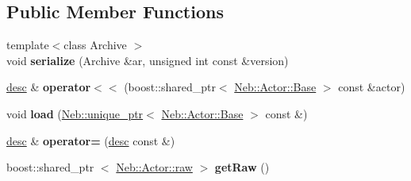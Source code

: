 \subsection*{\-Public \-Member \-Functions}
\begin{DoxyCompactItemize}
\item 
\hypertarget{classNeb_1_1Actor_1_1desc_aa46b5e2700b61f5bea052b88745cb247}{{\footnotesize template$<$class Archive $>$ }\\void {\bfseries serialize} (\-Archive \&ar, unsigned int const \&version)}\label{classNeb_1_1Actor_1_1desc_aa46b5e2700b61f5bea052b88745cb247}

\item 
\hypertarget{classNeb_1_1Actor_1_1desc_aea36e3efdf98f30101cb6aca223d51b5}{\hyperlink{classNeb_1_1Actor_1_1desc}{desc} \& {\bfseries operator$<$$<$} (boost\-::shared\-\_\-ptr$<$ \hyperlink{classNeb_1_1Actor_1_1Base}{\-Neb\-::\-Actor\-::\-Base} $>$ const \&actor)}\label{classNeb_1_1Actor_1_1desc_aea36e3efdf98f30101cb6aca223d51b5}

\item 
\hypertarget{classNeb_1_1Actor_1_1desc_af2fde9c8751c5d2d9ebe38d36a8acab5}{void {\bfseries load} (\hyperlink{classNeb_1_1unique__ptr}{\-Neb\-::unique\-\_\-ptr}$<$ \hyperlink{classNeb_1_1Actor_1_1Base}{\-Neb\-::\-Actor\-::\-Base} $>$ const \&)}\label{classNeb_1_1Actor_1_1desc_af2fde9c8751c5d2d9ebe38d36a8acab5}

\item 
\hypertarget{classNeb_1_1Actor_1_1desc_aec64f60a2aa08873c91b60189bec69e4}{\hyperlink{classNeb_1_1Actor_1_1desc}{desc} \& {\bfseries operator=} (\hyperlink{classNeb_1_1Actor_1_1desc}{desc} const \&)}\label{classNeb_1_1Actor_1_1desc_aec64f60a2aa08873c91b60189bec69e4}

\item 
\hypertarget{classNeb_1_1Actor_1_1desc_a5d652110b4f6bc979ccfdd0d346c40b7}{boost\-::shared\-\_\-ptr\*
$<$ \hyperlink{classNeb_1_1Actor_1_1raw}{\-Neb\-::\-Actor\-::raw} $>$ {\bfseries get\-Raw} ()}\label{classNeb_1_1Actor_1_1desc_a5d652110b4f6bc979ccfdd0d346c40b7}

\end{DoxyCompactItemize}
